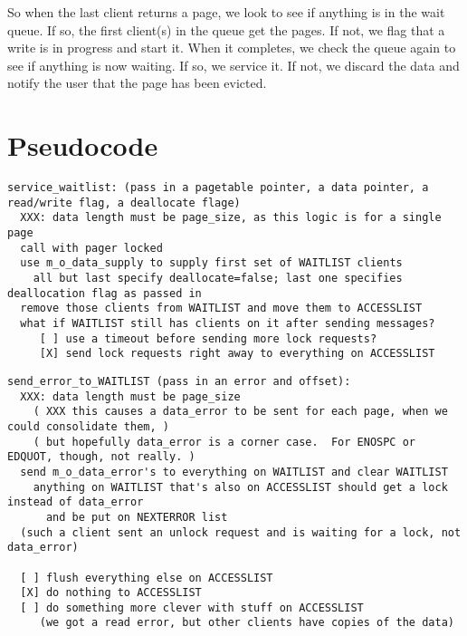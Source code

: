 \documentclass{article}
\begin{document}
So when the last client returns a page, we look to see if anything is
in the wait queue.  If so, the first client(s) in the queue get the
pages.  If not, we flag that a write is in progress and start it.
When it completes, we check the queue again to see if anything is now
waiting.  If so, we service it.  If not, we discard the data and
notify the user that the page has been evicted.



\section{Pseudocode}

\begin{verbatim}
service_waitlist: (pass in a pagetable pointer, a data pointer, a read/write flag, a deallocate flage)
  XXX: data length must be page_size, as this logic is for a single page
  call with pager locked
  use m_o_data_supply to supply first set of WAITLIST clients
    all but last specify deallocate=false; last one specifies deallocation flag as passed in
  remove those clients from WAITLIST and move them to ACCESSLIST
  what if WAITLIST still has clients on it after sending messages?
     [ ] use a timeout before sending more lock requests?
     [X] send lock requests right away to everything on ACCESSLIST
\end{verbatim}

\begin{verbatim}
send_error_to_WAITLIST (pass in an error and offset):
  XXX: data length must be page_size
    ( XXX this causes a data_error to be sent for each page, when we could consolidate them, )
    ( but hopefully data_error is a corner case.  For ENOSPC or EDQUOT, though, not really. )
  send m_o_data_error's to everything on WAITLIST and clear WAITLIST
    anything on WAITLIST that's also on ACCESSLIST should get a lock instead of data_error
      and be put on NEXTERROR list
  (such a client sent an unlock request and is waiting for a lock, not data_error)

  [ ] flush everything else on ACCESSLIST
  [X] do nothing to ACCESSLIST
  [ ] do something more clever with stuff on ACCESSLIST
     (we got a read error, but other clients have copies of the data)
\end{verbatim}
\end{document}
